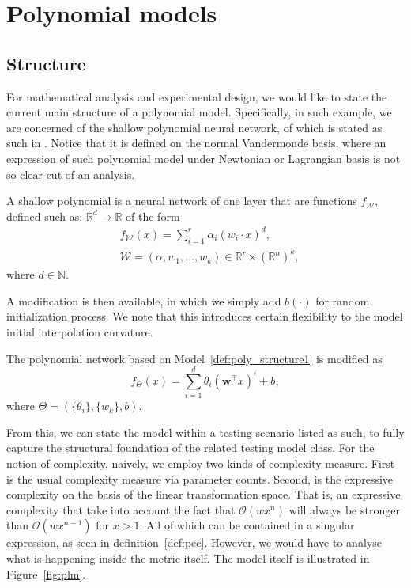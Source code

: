 \section{Polynomial models}

\subsection{Structure}

For mathematical analysis and experimental design, we would like to state the current main structure of a polynomial model. Specifically, in such example, we are concerned of the shallow polynomial neural network, of which is stated as such in \cite{arjevani2025geometryoptimizationshallowpolynomial}. Notice that it is defined on the normal Vandermonde basis, where an expression of such polynomial model under Newtonian or Lagrangian basis is not so clear-cut of an analysis. 

\begin{definition}\label{def:poly_structure1}
    A shallow polynomial is a neural network of one layer that are functions $f_{\mathcal W}$, defined such as:
$\mathbb R^d \rightarrow \mathbb{R}$ of the form
\begin{equation}\label{eq:network_model} 
    \begin{split}
        &f_{\mathcal W}(x) = \sum_{i=1}^r
\alpha_{i} (w_i \cdot x)^d,\\  
&\mathcal W = (\alpha,w_1,\ldots,w_k) \in
\mathbb{R}^r \times (\mathbb{R}^{n})^k,
    \end{split}
\end{equation} 
where $d \in \mathbb{N}$.
\end{definition}

A modification is then available, in which we simply add $b(\cdot)$ for random initialization process. We note that this introduces certain flexibility to the model initial interpolation curvature.   
\begin{definition}\label{def:poly_model_test}
    The polynomial network based on Model~\ref{def:poly_structure1} is modified as 
    \begin{equation}
        f_{\Theta}(x) = \sum_{i=1}^{d} \theta_i \left( \mathbf{w}^\top x \right)^i + b,
    \end{equation}
    where $\Theta = (\{\theta_{i}\},\{w_{k}\},b)$.
\end{definition}

From this, we can state the model within a testing scenario listed as such, to fully capture the structural foundation of the related testing model class. For the notion of complexity, naively, we employ two kinds of complexity measure. First is the usual complexity measure via parameter counts. Second, is the expressive complexity on the basis of the linear transformation space. That is, an expressive complexity that take into account the fact that $\mathcal{O}(wx^{n})$ will always be stronger than $\mathcal{O}(wx^{n-1})$ for $x>1$. All of which can be contained in a singular expression, as seen in definition~\ref{def:pec}. However, we would have to analyse what is happening inside the metric itself. The model itself is illustrated in Figure~\ref{fig:plm}.

